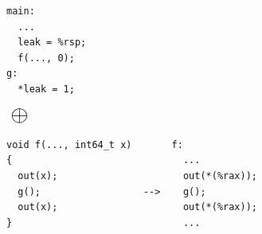 \begin{figure}[t]
\hspace*{-1.9mm}
\begin{minipage}{0.255\textwidth}
  \begin{Verbatim}[frame=single]
main:
  ...  
  leak = %rsp;
  f(..., 0);
g:
  *leak = 1;
  \end{Verbatim}
\end{minipage}
$\mbox{}~\mathlarger{\mathlarger{\mathlarger{\mathlarger{\mathlarger{\llink}}}}}~\mbox{}$
\hspace*{-1.9mm}
\begin{minipage}{0.695\textwidth}
  \begin{Verbatim}[frame=single]
void f(..., int64_t x)       f:
{                              ...
  out(x);                      out(*(%rax));
  g();                  -->    g();
  out(x);                      out(*(%rax));
}                              ...
  \end{Verbatim}
\end{minipage}
\\[1mm]
\hspace*{-2.7mm}
\begin{minipage}{.95\textwidth}
\end{minipage}

\end{figure}
